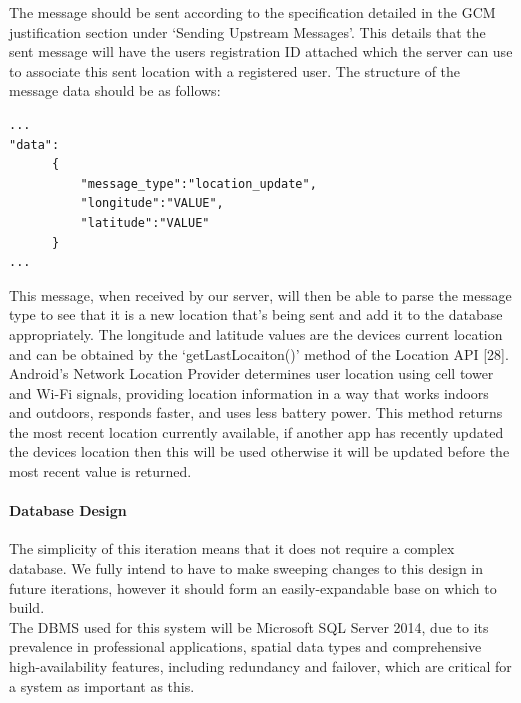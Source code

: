 \documentclass{article}
\begin{document}
The message should be sent according to the specification detailed in the GCM justification section under ‘Sending Upstream Messages’. This details that the sent message will have the users registration ID attached which the server can use to associate this sent location with a registered user. The structure of the message data should be as follows:
\begin{lstlisting}
...
"data":
      {
          "message_type":"location_update",
          "longitude":"VALUE",
          "latitude":"VALUE"
      }
...
\end{lstlisting}
This message, when received by our server, will then be able to parse the message type to see that it is a new location that's being sent and add it to the database appropriately. The longitude and latitude values are the devices current location and can be obtained by the ‘getLastLocaiton()’ method of the Location API [28]. Android's Network Location Provider determines user location using cell tower and Wi-Fi signals, providing location information in a way that works indoors and outdoors, responds faster, and uses less battery power. This method returns the most recent location currently available, if another app has recently updated the devices location then this will be used otherwise it will be updated before the most recent value is returned.\\

\paragraph{Database Design}
The simplicity of this iteration means that it does not require a complex database. We fully intend to have to make sweeping changes to this design in future iterations, however it should form an easily-expandable base on which to build.\\

The DBMS used for this system will be Microsoft SQL Server 2014, due to its prevalence in professional applications, spatial data types and comprehensive high-availability features, including redundancy and failover, which are critical for a system as important as this.\\
\end{document}

